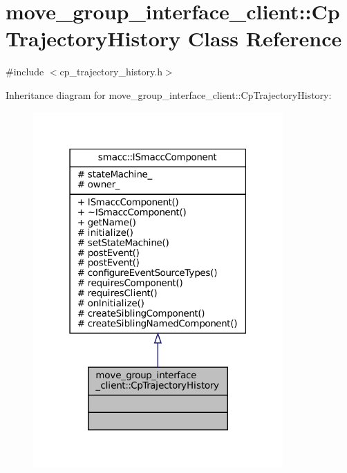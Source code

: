 \hypertarget{classmove__group__interface__client_1_1CpTrajectoryHistory}{}\section{move\+\_\+group\+\_\+interface\+\_\+client\+:\+:Cp\+Trajectory\+History Class Reference}
\label{classmove__group__interface__client_1_1CpTrajectoryHistory}


{\ttfamily \#include $<$cp\+\_\+trajectory\+\_\+history.\+h$>$}



Inheritance diagram for move\+\_\+group\+\_\+interface\+\_\+client\+:\+:Cp\+Trajectory\+History\+:
\nopagebreak
\begin{figure}[H]
\begin{center}
\leavevmode
\includegraphics[width=271pt]{classmove__group__interface__client_1_1CpTrajectoryHistory__inherit__graph}
\end{center}
\end{figure}



